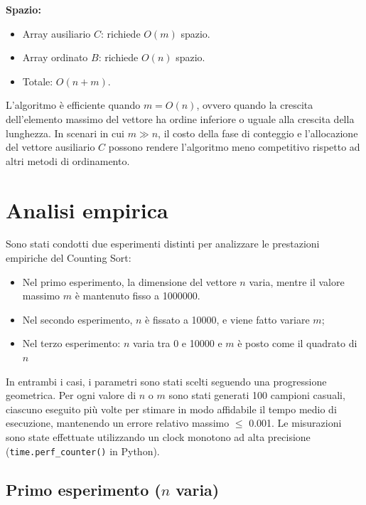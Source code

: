 \documentclass[a4paper, 12pt, oneside]{book}
\begin{document}
\noindent \textbf{Spazio:}

\begin{itemize}
    \item Array ausiliario \(C\): richiede \(O(m)\) spazio.
    \item Array ordinato \(B\): richiede \(O(n)\) spazio.
    \item Totale: \(O(n + m)\).
\end{itemize}

\noindent L'algoritmo è efficiente quando \(m = O(n)\), ovvero quando la crescita dell'elemento massimo del vettore ha ordine inferiore o uguale alla crescita della lunghezza.
In scenari in cui \(m \gg n\), il costo della fase di conteggio e l'allocazione del vettore ausiliario \(C\) possono rendere l'algoritmo meno competitivo rispetto ad altri metodi di ordinamento.


\section{Analisi empirica}

Sono stati condotti due esperimenti distinti per analizzare le prestazioni empiriche del Counting Sort:

\begin{itemize}
    \item Nel primo esperimento, la dimensione del vettore \(n\) varia, mentre il valore massimo \(m\) è mantenuto fisso a 1000000.
    \item Nel secondo esperimento, \(n\) è fissato a 10000, e viene fatto variare \(m\);
    \item Nel terzo esperimento: \(n\) varia tra 0 e 10000 e \(m\) è posto come il quadrato di \(n\)
\end{itemize}

\noindent In entrambi i casi, i parametri sono stati scelti seguendo una progressione geometrica.
Per ogni valore di \(n\) o \(m\) sono stati generati 100 campioni casuali, ciascuno eseguito più volte per stimare in modo affidabile il tempo medio di esecuzione, mantenendo un errore relativo massimo \(\leq\) 0.001.
Le misurazioni sono state effettuate utilizzando un clock monotono ad alta precisione (\texttt{time.perf\_counter()} in Python). \\

\subsection{Primo esperimento ($n$ varia)}
\end{document}

